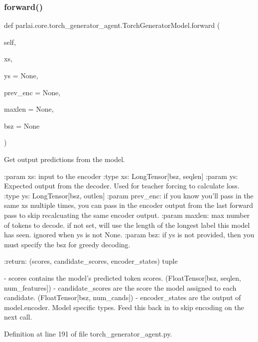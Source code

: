 \subsubsection{\texorpdfstring{forward()}{forward()}}
{\footnotesize\ttfamily def parlai.\+core.\+torch\+\_\+generator\+\_\+agent.\+Torch\+Generator\+Model.\+forward (\begin{DoxyParamCaption}\item[{}]{self,  }\item[{}]{xs,  }\item[{}]{ys = {\ttfamily None},  }\item[{}]{prev\+\_\+enc = {\ttfamily None},  }\item[{}]{maxlen = {\ttfamily None},  }\item[{}]{bsz = {\ttfamily None} }\end{DoxyParamCaption})}

\begin{DoxyVerb}Get output predictions from the model.

:param xs:
    input to the encoder
:type xs:
    LongTensor[bsz, seqlen]
:param ys:
    Expected output from the decoder. Used
    for teacher forcing to calculate loss.
:type ys:
    LongTensor[bsz, outlen]
:param prev_enc:
    if you know you'll pass in the same xs multiple times, you can pass
    in the encoder output from the last forward pass to skip
    recalcuating the same encoder output.
:param maxlen:
    max number of tokens to decode. if not set, will use the length of
    the longest label this model has seen. ignored when ys is not None.
:param bsz:
    if ys is not provided, then you must specify the bsz for greedy
    decoding.

:return:
    (scores, candidate_scores, encoder_states) tuple

    - scores contains the model's predicted token scores.
      (FloatTensor[bsz, seqlen, num_features])
    - candidate_scores are the score the model assigned to each candidate.
      (FloatTensor[bsz, num_cands])
    - encoder_states are the output of model.encoder. Model specific types.
      Feed this back in to skip encoding on the next call.
\end{DoxyVerb}
 

Definition at line 191 of file torch\+\_\+generator\+\_\+agent.\+py.


